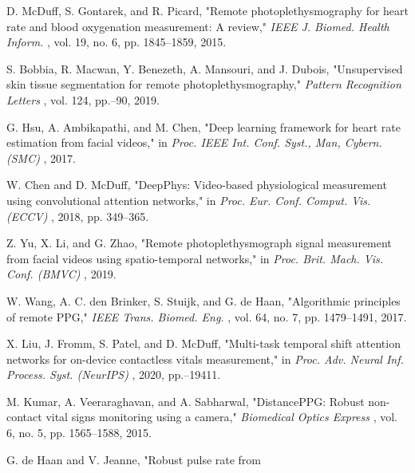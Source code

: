 \documentclass[twocolumn,letterpaper]{article}
\newcommand\refsize{\fontsize{8.1}{9.4}\selectfont}
\newcommand\headsize{\fontsize{10}{12}\selectfont}
\newcommand\lb{\linebreak[4]\relax}                         %
\newcommand\SectionNoNum[1]{%
  \par\vspace{5.4pt}%
  {\headsize\noindent\makebox[\linewidth][c]{#1}\par}%
  \vspace{1.25pt}}
\begin{document}
\SectionNoNum{REFERENCES}
\vspace{-1.6pt}
{\refsize
\begin{list}{}{\setlength\leftmargin{15.7pt}\setlength{}%
  \setlength{}\setlength\itemsep{1.4pt}\setlength\parsep{0pt}%
  \setlength\topsep{0pt}\setlength\partopsep{0pt}\setlength\itemindent{0pt}%
  \renewcommand\makelabel[1]{\hspace{0.7pt}#1\hfil}}
\item[{[1]}] D. McDuff, S. Gontarek, and R. Picard, "Remote\newline
photoplethysmography for heart rate and blood oxygenation\lb
measurement: A review," \textit{IEEE J. Biomed. Health Inform.} , vol. 19,\lb
no. 6, pp. 1845--1859, 2015.
\item[{[2]}] S. Bobbia, R. Macwan, Y. Benezeth, A. Mansouri, and J. Dubois,\lb
"Unsupervised skin tissue segmentation for remote\newline
photoplethysmography," \textit{Pattern Recognition Letters} , vol. 124, pp.\lb
82--90, 2019.
\item[{[3]}] G. Hsu, A. Ambikapathi, and M. Chen, "Deep learning framework for\lb
heart rate estimation from facial videos," in \textit{Proc. IEEE Int. Conf.\lb
Syst., Man, Cybern. (SMC)} , 2017.
\item[{[4]}] W. Chen and D. McDuff, "DeepPhys: Video-based physiological\lb
measurement using convolutional attention networks," in \textit{Proc. Eur.\lb
Conf. Comput. Vis. (ECCV)} , 2018, pp. 349--365.
\item[{[5]}] Z. Yu, X. Li, and G. Zhao, "Remote photoplethysmograph signal\lb
measurement from facial videos using spatio-temporal networks," in\lb
\textit{Proc. Brit. Mach. Vis. Conf. (BMVC)} , 2019.
\item[{[6]}] W. Wang, A. C. den Brinker, S. Stuijk, and G. de Haan, "Algorithmic\lb
principles of remote PPG," \textit{IEEE Trans. Biomed. Eng.} , vol. 64, no. 7,\lb
pp. 1479--1491, 2017.
\item[{[7]}] X. Liu, J. Fromm, S. Patel, and D. McDuff, "Multi-task temporal shift\lb
attention networks for on-device contactless vitals measurement," in\lb
\textit{Proc. Adv. Neural Inf. Process. Syst. (NeurIPS)} , 2020, pp.\lb
19400--19411.
\item[{[8]}] M. Kumar, A. Veeraraghavan, and A. Sabharwal, "DistancePPG:\lb
Robust non-contact vital signs monitoring using a camera," \textit{Biomedical\lb
Optics Express} , vol. 6, no. 5, pp. 1565--1588, 2015.
\item[{[9]}] G. de Haan and V. Jeanne, "Robust pulse rate from\newline

\end{list}}
\end{document}
